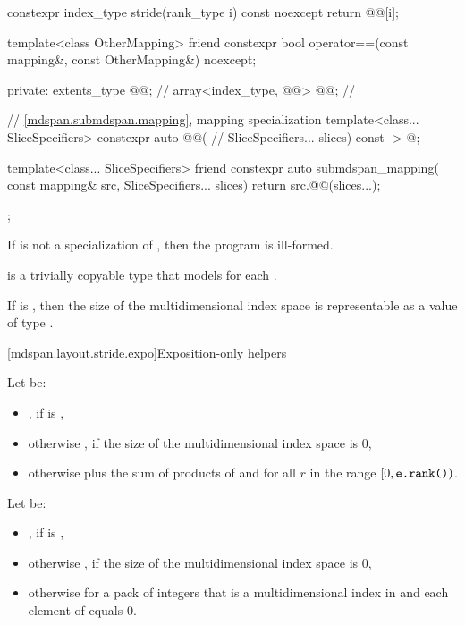 \begin{codeblock}
{{    constexpr index_type stride(rank_type i) const noexcept { return @@[i]; }

    template<class OtherMapping>
      friend constexpr bool operator==(const mapping&, const OtherMapping&) noexcept;

  private:
    extents_type @@{};                    // \expos
    array<index_type, @@> @@{};        // \expos

    // \ref{mdspan.submdspan.mapping},  mapping specialization
    template<class... SliceSpecifiers>
      constexpr auto @@(                    // \expos
        SliceSpecifiers... slices) const -> @\seebelow@;

    template<class... SliceSpecifiers>
      friend constexpr auto submdspan_mapping(
        const mapping& src, SliceSpecifiers... slices) {
          return src.@@(slices...);
      }
  };
}
\end{codeblock}

\pnum
If  is not a specialization of ,
then the program is ill-formed.

\pnum
{} is a trivially copyable type
that models  for each .

\pnum
\mandates
If  is ,
then the size of the multidimensional index space 
is representable as a value of type .

[mdspan.layout.stride.expo]{Exposition-only helpers}

\pnum
Let  be:
\begin{itemize}
\item
{}, if  is ,
\item
otherwise , if the size of the multidimensional index space  is 0,
\item
otherwise  plus the sum of products of  and 
for all $r$ in the range $[0, \tcode{e.rank()})$.
\end{itemize}

\pnum
Let  be:
\begin{itemize}
\item
{}, if  is ,
\item
otherwise , if the size of the multidimensional index space  is 0,
\item
otherwise  for a pack of integers 
that is a multidimensional index in  and
each element of  equals 0.
\end{itemize}

